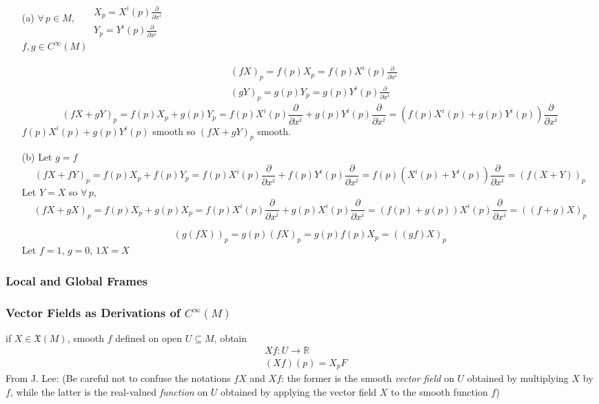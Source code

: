 \documentclass[11pt]{amsart}
\theoremstyle{definition}
\begin{document}
\begin{enumerate}
\item[(a)] $\forall \, p \in M$, \, $\begin{aligned} & \quad \\
  & X_p = X^i(p) \frac{ \partial }{ \partial x^i} \\
  & Y_p = Y^i(p) \frac{ \partial }{ \partial x^i } \end{aligned}$ \\
$f,g \in C^{\infty}{(M)}$

\[
\begin{aligned}
  & (fX)_p = f(p)X_p = f(p) X^i(p) \frac{ \partial }{ \partial x^i } \\
  & (gY)_p = g(p)Y_p = g(p)Y^i(p) \frac{ \partial }{ \partial x^i }
\end{aligned}
\]
\[
(fX + gY)_p  = f(p)X_p + g(p)Y_p = f(p) X^i(p) \frac{ \partial}{ \partial x^i} + g(p)Y^i(p) \frac{ \partial }{ \partial x^i } = (f(p)X^i(p) + g(p) Y^i(p)) \frac{ \partial }{ \partial x^i }
\]
$f(p)X^i(p) + g(p)Y^i(p)$ smooth so $(fX+gY)_p$ smooth.
\item[(b)] Let $g=f$
\[
(fX+fY)_p = f(p)X_p + f(p)Y_p = f(p)X^i(p) \frac{ \partial }{ \partial x^i} + f(p)Y^i(p)\frac{ \partial}{\partial x^i} = f(p)(X^i(p) + Y^i(p))\frac{ \partial }{ \partial x^i } = (f(X+Y))_p
\]
Let $Y=X$ so $\forall \, p$,
\[
(fX+gX)_p  = f(p)X_p + g(p)X_p = f(p)X^i(p)\frac{ \partial}{ \partial x^i} +g(p)X^i(p) \frac{ \partial }{ \partial x^i} = (f(p) + g(p))X^i(p)\frac{ \partial }{ \partial x^i } = ((f+g)X)_p
\]

\[
(g(fX))_p = g(p)(fX)_p= g(p)f(p)X_p = ((gf)X)_p
\]
Let $f=1$, $g=0$, $1X=X$
\end{enumerate}





\hrulefill

\subsubsection*{Local and Global Frames}

\subsubsection*{Vector Fields as Derivations of $C^{\infty}(M)$}

if $X \in \mathfrak{X}(M)$, smooth $f$ defined on open $U\subseteq M$, obtain
\[
\begin{aligned}
  & Xf : U \to \mathbb{R} \\
  & (Xf)(p) = X_p F
\end{aligned}
\]
From J. Lee: (Be careful not to confuse the notations $fX$ and $Xf$: the former is the smooth \emph{vector field} on $U$ obtained by multiplying $X$ by $f$, while the latter is the real-valued \emph{function} on $U$ obtained by applying the vector field $X$ to the smooth function $f$)
\end{document}
